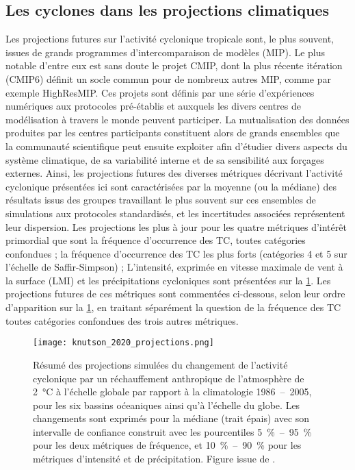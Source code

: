 \documentclass[../main.tex]{subfiles}
\begin{document}
\subsection{Les cyclones dans les projections climatiques}\label{sec:projections_futures}

Les projections futures sur l'activité cyclonique tropicale sont, le plus souvent, issues de grands programmes d'intercomparaison de modèles (MIP). Le plus
notable d'entre eux est sans doute le projet CMIP, dont la plus récente itération (CMIP6) définit un socle commun pour de nombreux autres MIP, comme par exemple
HighResMIP. Ces projets sont définis par une série d'expériences numériques aux protocoles pré-établis et auxquels les divers centres de modélisation à travers
le monde peuvent participer. La mutualisation des données produites par les centres participants constituent alors de grands ensembles que la communauté
scientifique peut ensuite exploiter afin d'étudier divers aspects du système climatique, de sa variabilité interne et de sa sensibilité aux forçages externes.
Ainsi, les projections futures des diverses métriques décrivant l'activité cyclonique présentées ici sont caractérisées par la moyenne (ou la médiane) des
résultats issus des groupes travaillant le plus souvent sur ces ensembles de simulations aux protocoles standardisés, et les incertitudes associées représentent
leur dispersion. Les projections les plus à jour pour les quatre métriques d'intérêt primordial que sont la fréquence d'occurrence des TC, toutes catégories
confondues ; la fréquence d'occurrence des TC les plus forts (catégories 4 et 5 sur l'échelle de Saffir-Simpson) ; L'intensité, exprimée en vitesse maximale de
vent à la surface (LMI) et les précipitations cycloniques sont présentées sur la \cref{fig:projections_TC}. Les projections futures de ces métriques sont
commentées ci-dessous, selon leur ordre d'apparition sur la \cref{fig:projections_TC}, en traitant séparément la question de la fréquence des TC toutes
catégories confondues des trois autres métriques.
%
\begin{figure}[tb]
    \centering
    \texttt{[image: knutson\_2020\_projections.png]}
    \caption{Résumé des projections simulées du changement de l'activité cyclonique par un réchauffement anthropique de l'atmosphère de \SI{2}{\degreeCelsius} à
        l'échelle globale par rapport à la climatologie \num{1986}~--~\num{2005}, pour les six bassins oćeaniques ainsi qu'à l'échelle du globe. Les changements
        sont exprimés pour la médiane (trait épais) avec son intervalle de confiance construit avec les pourcentiles \SI{5}{\percent}~--~\SI{95}{\percent} pour
        les deux métriques de fréquence, et \SI{10}{\percent}~--~\SI{90}{\percent} pour les métriques d'intensité et de précipitation. Figure issue de
        \textcite{knutson_tropical_2020}.}
    \label{fig:projections_TC}
\end{figure}
\end{document}
